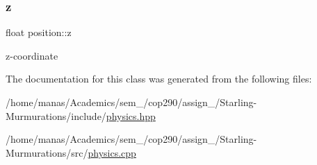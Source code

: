 \subsubsection{\texorpdfstring{z}{z}}
{\footnotesize\ttfamily float position\+::z}



z-\/coordinate 



The documentation for this class was generated from the following files\+:\begin{DoxyCompactItemize}
\item 
/home/manas/\+Academics/sem\+\_/cop290/assign\+\_/\+Starling-\/\+Murmurations/include/\mbox{\hyperlink{physics_8hpp}{physics.\+hpp}}\item 
/home/manas/\+Academics/sem\+\_/cop290/assign\+\_/\+Starling-\/\+Murmurations/src/\mbox{\hyperlink{physics_8cpp}{physics.\+cpp}}\end{DoxyCompactItemize}
